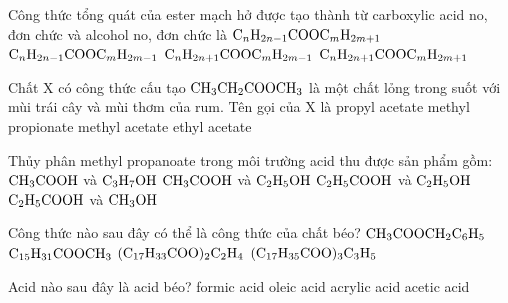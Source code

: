 \documentclass[12pt,a4paper]{article}
\begin{document}
\begin{ex}
Công thức tổng quát của ester mạch hở được tạo thành từ carboxylic acid no, đơn chức và alcohol no, đơn chức là
\choice
{$\ce{C_{n}H_{2n-1}COOC_{m}H_{2m+1}}$}
{$\ce{C_{n}H_{2n-1}COOC_{m}H_{2m-1}}$}
{$\ce{C_{n}H_{2n+1}COOC_{m}H_{2m-1}}$}
{\True $\ce{C_{n}H_{2n+1}COOC_{m}H_{2m+1}}$}
\end{ex}

\begin{ex}
Chất X có công thức cấu tạo $\ce{CH3CH2COOCH3}$ là một chất lỏng trong suốt với mùi trái cây và mùi thơm của rum. Tên gọi của X là
\choice
{propyl acetate}
{\True methyl propionate}
{methyl acetate}
{ethyl acetate}
\end{ex}

\begin{ex}
Thủy phân methyl propanoate trong môi trường acid thu được sản phẩm gồm:
\choice
{$\ce{CH3COOH}$ và $\ce{C3H7OH}$}
{$\ce{CH3COOH}$ và $\ce{C2H5OH}$}
{$\ce{C2H5COOH}$ và $\ce{C2H5OH}$}
{\True $\ce{C2H5COOH}$ và $\ce{CH3OH}$}
\end{ex}

\begin{ex}
Công thức nào sau đây có thể là công thức của chất béo?
\choice
{$\ce{CH3COOCH2C6H5}$}
{$\ce{C15H31COOCH3}$}
{$\ce{(C17H33COO)2C2H4}$}
{\True $\ce{(C17H35COO)3C3H5}$}
\end{ex}

\begin{ex}
Acid nào sau đây là acid béo?
\choice
{formic acid}
{\True oleic acid}
{acrylic acid}
{acetic acid}
\end{ex}
\end{document}
